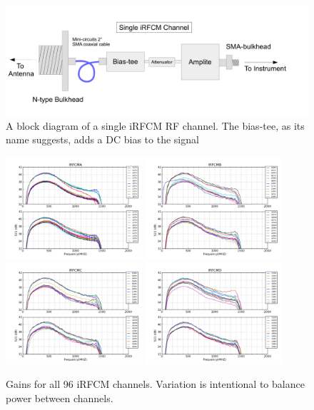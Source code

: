 \begin{figure}
\centering
	\includegraphics[width=\textwidth]{figures/IRFCM}
	\caption{A block diagram of a single iRFCM RF channel.  The bias-tee, as its name suggests, adds a DC bias to the signal }
	\label{fig:IRFCM}
\end{figure}
	
\begin{figure}
\centering
	\includegraphics[width=0.45\textwidth]{figures/IRFCMA}
	\includegraphics[width=0.45\textwidth]{figures/IRFCMB}	
	\includegraphics[width=0.45\textwidth]{figures/IRFCMC}
	\includegraphics[width=0.45\textwidth]{figures/IRFCMD}	
	\caption{Gains for all 96 iRFCM channels.  Variation is intentional to balance power between channels.}
	\label{fig:IRFCMgain}
\end{figure}		

